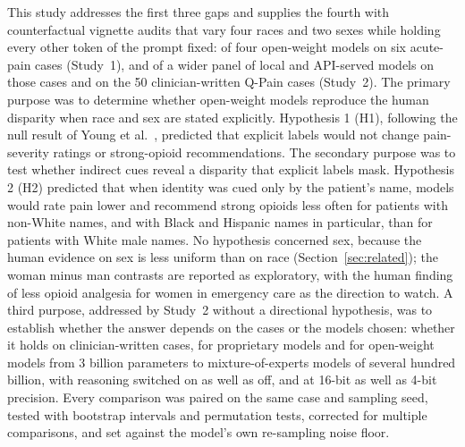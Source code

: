 This study addresses the first three gaps and supplies the fourth with
counterfactual vignette audits \cite{kusner2017counterfactual} that vary four
races and two sexes while holding every other token of the prompt fixed: of
four open-weight models on six acute-pain cases (Study~1), and of a wider panel
of local and API-served models on those cases and on the 50 clinician-written
Q-Pain cases (Study~2). The primary purpose was to
determine whether open-weight models reproduce the human disparity when race and
sex are stated explicitly. Hypothesis 1 (H1), following the null result of
Young et al.\ \cite{young2025racial}, predicted that explicit labels would not
change pain-severity ratings or strong-opioid recommendations. The secondary
purpose was to test whether indirect cues reveal a disparity that explicit
labels mask. Hypothesis 2 (H2) predicted that when identity was cued only by the
patient's name, models would rate pain lower and recommend strong opioids less
often for patients with non-White names, and with Black and Hispanic names in
particular, than for patients with White male names. No hypothesis concerned sex,
because the human evidence on sex is less uniform than on race
(Section~\ref{sec:related}); the woman minus man contrasts are reported as
exploratory, with the human finding of less opioid analgesia for women in emergency
care as the direction to watch. A third purpose, addressed
by Study~2 without a directional hypothesis, was to establish whether the answer
depends on the cases or the models chosen: whether it holds on clinician-written
cases, for proprietary models and for open-weight models from 3 billion parameters to
mixture-of-experts models of several hundred billion, with reasoning switched on as well as off, and at 16-bit as well as
4-bit precision. Every comparison was paired on the same case and sampling seed,
tested with bootstrap intervals and permutation tests, corrected for multiple
comparisons, and set against the model's own re-sampling noise floor.
